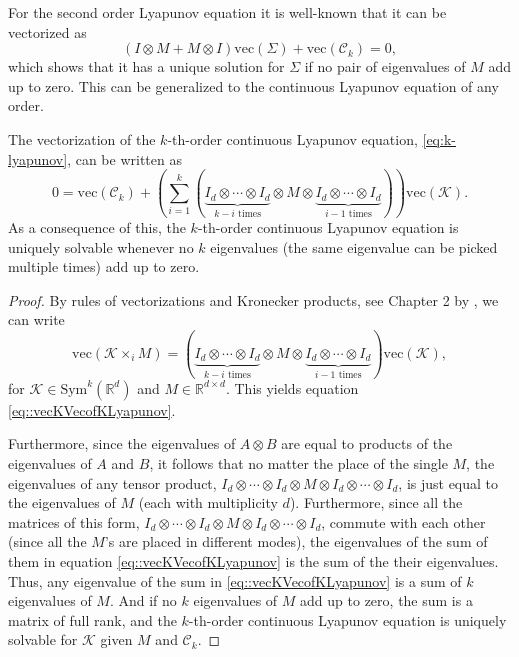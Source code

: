 \documentclass{biometrika}
\begin{document}
For the second order Lyapunov equation it is well-known that it can be vectorized as 
$$(I \otimes M + M \otimes I) \mathrm{vec}(\Sigma) + \mathrm{vec}(\mathcal{C}_k) = 0,$$ 
which shows that it has a unique solution for $\Sigma$ if no pair of eigenvalues of $M$ add up to zero. This can be generalized to the continuous Lyapunov equation of any order.
\begin{proposition} \label{prop::VecOfEquation}
    The vectorization of the $k$-th-order continuous Lyapunov equation, \eqref{eq:k-lyapunov}, can be written as 
    \begin{equation} \label{eq::vecKVecofKLyapunov}
        0 = \mathrm{vec}(\mathcal{C}_k) + \left( \sum_{i = 1}^k (\underbrace{I_{d}\otimes\cdots\otimes I_{d}}_{k-i \text{ times}} \otimes M \otimes  \underbrace{I_{d}\otimes\cdots\otimes I_{d}}_{i-1 \text{ times}})   \right) \mathrm{vec}(\mathcal{K} ).
    \end{equation}
    As a consequence of this, the $k$-th-order continuous Lyapunov equation is uniquely solvable whenever no $k$ eigenvalues (the same eigenvalue can be picked multiple times) add up to zero.
\end{proposition}
\begin{proof}
    By rules of vectorizations and Kronecker products, see Chapter 2 by \cite{magnus_neudecker_2019}, we can write
    \begin{equation*}
        \mathrm{vec}(\mathcal{K}  \times_i M) = (\underbrace{I_{d}\otimes\cdots\otimes I_{d}}_{k-i \text{ times}} \otimes M \otimes  \underbrace{I_{d}\otimes\cdots\otimes I_{d}}_{i-1 \text{ times}})\mathrm{vec}(\mathcal{K} ),
    \end{equation*}
    for $\mathcal{K}  \in \mathrm{Sym}^k(\mathbb{R}^d)$ and $M \in \mathbb{R}^{d \times d}$. This yields equation \eqref{eq::vecKVecofKLyapunov}. 

    Furthermore, since the eigenvalues of $A \otimes B$ are equal to products of the eigenvalues of $A$ and $B$, it follows that no matter the place of the single $M$, the eigenvalues of any tensor product, $I_d \otimes \cdots \otimes I_d \otimes M \otimes I_d \otimes \cdots \otimes I_d $, is just equal to the eigenvalues of $M$ (each with multiplicity $d$). Furthermore, since all the matrices of this form, $I_d \otimes \cdots \otimes I_d \otimes M \otimes I_d \otimes \cdots \otimes I_d $, commute with each other (since all the $M$'s are placed in different modes), the eigenvalues of the sum of them in equation \eqref{eq::vecKVecofKLyapunov} is the sum of the their eigenvalues. Thus, any eigenvalue of
    the sum in \eqref{eq::vecKVecofKLyapunov} is a sum of $k$ eigenvalues of $M$. And if no $k$ eigenvalues of $M$ add up to zero, the sum is a matrix of full rank, and the $k$-th-order continuous Lyapunov equation is uniquely solvable for $\mathcal{K} $ given $M$ and $\mathcal{C}_k$. 
\end{proof}
\end{document}
